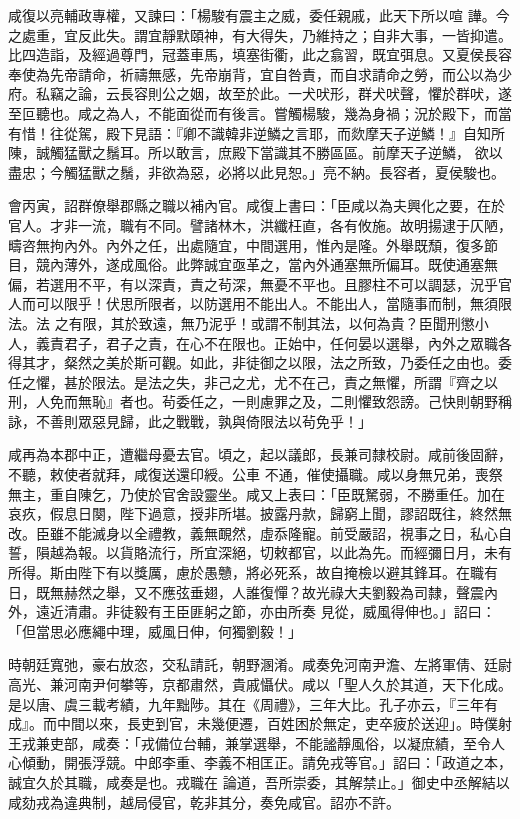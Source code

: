 \begin{pinyinscope}
 咸復以亮輔政專權，又諫曰：「楊駿有震主之威，委任親戚，此天下所以喧
 譁。今之處重，宜反此失。謂宜靜默頤神，有大得失，乃維持之；自非大事，一皆抑遣。比四造詣，及經過尊門，冠蓋車馬，填塞街衢，此之翕習，既宜弭息。又夏侯長容奉使為先帝請命，祈禱無感，先帝崩背，宜自咎責，而自求請命之勞，而公以為少府。私竊之論，云長容則公之姻，故至於此。一犬吠形，群犬吠聲，懼於群吠，遂至叵聽也。咸之為人，不能面從而有後言。嘗觸楊駿，幾為身禍；況於殿下，而當有惜！往從駕，殿下見語：『卿不識韓非逆鱗之言耶，而欻摩天子逆鱗！』自知所陳，誠觸猛獸之鬚耳。所以敢言，庶殿下當識其不勝區區。前摩天子逆鱗，
 欲以盡忠；今觸猛獸之鬚，非欲為惡，必將以此見恕。」亮不納。長容者，夏侯駿也。



 會丙寅，詔群僚舉郡縣之職以補內官。咸復上書曰：「臣咸以為夫興化之要，在於官人。才非一流，職有不同。譬諸林木，洪纖枉直，各有攸施。故明揚逮于仄陋，疇咨無拘內外。內外之任，出處隨宜，中間選用，惟內是隆。外舉既頹，復多節目，競內薄外，遂成風俗。此弊誠宜亟革之，當內外通塞無所偏耳。既使通塞無偏，若選用不平，有以深責，責之茍深，無憂不平也。且膠柱不可以調瑟，況乎官人而可以限乎！伏思所限者，以防選用不能出人。不能出人，當隨事而制，無須限法。法
 之有限，其於致遠，無乃泥乎！或謂不制其法，以何為貴？臣聞刑懲小人，義責君子，君子之責，在心不在限也。正始中，任何晏以選舉，內外之眾職各得其才，粲然之美於斯可觀。如此，非徒御之以限，法之所致，乃委任之由也。委任之懼，甚於限法。是法之失，非己之尤，尤不在己，責之無懼，所謂『齊之以刑，人免而無恥』者也。茍委任之，一則慮罪之及，二則懼致怨謗。己快則朝野稱詠，不善則眾惡見歸，此之戰戰，孰與倚限法以茍免乎！」



 咸再為本郡中正，遭繼母憂去官。頃之，起以議郎，長兼司隸校尉。咸前後固辭，不聽，敕使者就拜，咸復送還印綬。公車
 不通，催使攝職。咸以身無兄弟，喪祭無主，重自陳乞，乃使於官舍設靈坐。咸又上表曰：「臣既駑弱，不勝重任。加在哀疚，假息日闋，陛下過意，授非所堪。披露丹款，歸窮上聞，謬詔既往，終然無改。臣雖不能滅身以全禮教，義無靦然，虛忝隆寵。前受嚴詔，視事之日，私心自誓，隕越為報。以貨賂流行，所宜深絕，切敕都官，以此為先。而經彌日月，未有所得。斯由陛下有以獎厲，慮於愚戇，將必死系，故自掩檢以避其鋒耳。在職有日，既無赫然之舉，又不應弦垂翅，人誰復憚？故光祿大夫劉毅為司隸，聲震內外，遠近清肅。非徒毅有王臣匪躬之節，亦由所奏
 見從，威風得伸也。」詔曰：「但當思必應繩中理，威風日伸，何獨劉毅！」



 時朝廷寬弛，豪右放恣，交私請託，朝野溷淆。咸奏免河南尹澹、左將軍倩、廷尉高光、兼河南尹何攀等，京都肅然，貴戚懾伏。咸以「聖人久於其道，天下化成。是以唐、虞三載考績，九年黜陟。其在《周禮》，三年大比。孔子亦云，『三年有成』。而中間以來，長吏到官，未幾便遷，百姓困於無定，吏卒疲於送迎」。時僕射王戎兼吏部，咸奏：「戎備位台輔，兼掌選舉，不能謐靜風俗，以凝庶績，至令人心傾動，開張浮競。中郎李重、李義不相匡正。請免戎等官。」詔曰：「政道之本，誠宜久於其職，咸奏是也。戎職在
 論道，吾所崇委，其解禁止。」御史中丞解結以咸劾戎為違典制，越局侵官，乾非其分，奏免咸官。詔亦不許。




\end{pinyinscope}
